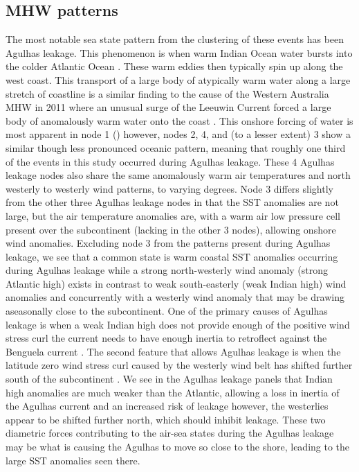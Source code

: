 \documentclass[a4paper,10pt,review]{elsarticle}
\begin{document}
\subsection{MHW patterns}
The most notable sea state pattern from the clustering of these events has been Agulhas leakage. This phenomenon is when warm Indian Ocean water bursts into the colder Atlantic Ocean \citep{Beal2011}. These warm eddies then typically spin up along the west coast. This transport of a large body of atypically warm water along a large stretch of coastline is a similar finding to the cause of the Western Australia MHW in 2011 where an unusual surge of the Leeuwin Current forced a large body of anomalously warm water onto the coast \citep{Feng2013, Benthuysen2014}. This onshore forcing of water is most apparent in node 1 () however, nodes 2, 4, and (to a lesser extent) 3 show a similar though less pronounced oceanic pattern, meaning that roughly one third of the events in this study occurred during Agulhas leakage. These 4 Agulhas leakage nodes also share the same anomalously warm air temperatures and north westerly to westerly wind patterns, to varying degrees. Node 3 differs slightly from the other three Agulhas leakage nodes in that the SST anomalies are not large, but the air temperature anomalies are, with a warm air low pressure cell present over the subcontinent (lacking in the other 3 nodes), allowing onshore wind anomalies. Excluding node 3 from the patterns present during Agulhas leakage, we see that a common state is warm coastal SST anomalies occurring during Agulhas leakage while a strong north-westerly wind anomaly (strong Atlantic high) exists in contrast to weak south-easterly (weak Indian high) wind anomalies and concurrently with a westerly wind anomaly that may be drawing aseasonally close to the subcontinent. One of the primary causes of Agulhas leakage is when a weak Indian high does not provide enough of the positive wind stress curl the current needs to have enough inertia to retroflect against the Benguela current \citep{Beal2011}. The second feature that allows Agulhas leakage is when the latitude zero wind stress curl caused by the westerly wind belt has shifted further south of the subcontinent \citep{Beal2011}. We see in the Agulhas leakage panels that Indian high anomalies are much weaker than the Atlantic, allowing a loss in inertia of the Agulhas current and an increased risk of leakage however, the westerlies appear to be shifted further north, which should inhibit leakage. These two diametric forces contributing to the air-sea states during the Agulhas leakage may be what is causing the Agulhas to move so close to the shore, leading to the large SST anomalies seen there.
\end{document}

